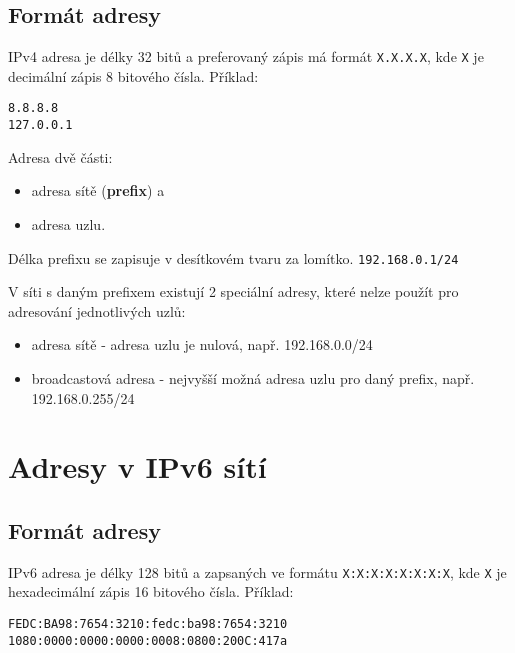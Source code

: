 \subsection{Formát adresy}
IPv4 adresa je délky 32 bitů a preferovaný zápis má formát {\tt X.X.X.X}, kde
{\tt X} je decimální zápis 8 bitového čísla. Příklad:\\
\begin{verbatim}
8.8.8.8
127.0.0.1
\end{verbatim}

Adresa dvě části:
\begin{itemize}
    \item adresa sítě ({\bf prefix}) a
    \item adresa uzlu.
\end{itemize}
Délka prefixu se zapisuje v desítkovém tvaru za lomítko. {\tt 192.168.0.1/24}

V síti s daným prefixem existují 2 speciální adresy, které nelze použít pro
adresování jednotlivých uzlů:
\begin{itemize}
    \item adresa sítě - adresa uzlu je nulová, např. 192.168.0.0/24
    \item broadcastová adresa - nejvyšší možná adresa uzlu pro daný prefix,
        např. 192.168.0.255/24
\end{itemize}

\section{Adresy v IPv6 sítí}\label{ipv6-teorie}

\subsection{Formát adresy}
IPv6 adresa je délky 128 bitů a zapsaných ve formátu {\tt X:X:X:X:X:X:X:X}, kde
{\tt X} je hexadecimální zápis 16 bitového čísla.
Příklad:\\
\begin{verbatim}
FEDC:BA98:7654:3210:fedc:ba98:7654:3210
1080:0000:0000:0000:0008:0800:200C:417a
\end{verbatim}

